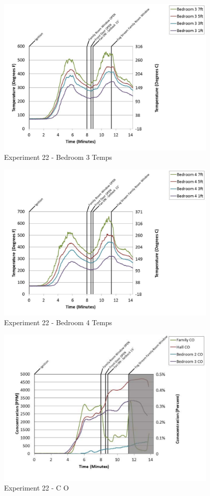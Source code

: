 \documentclass{article}
\begin{document}
\begin{appendices}
	\clearpage

	\begin{figure}[h!]
		\centering
		\includegraphics[height=3.05in]{0_Images/Results_Charts/Exp_22_Charts/Bedroom3Temps.pdf}
		\caption{Experiment 22 - Bedroom 3 Temps}
	\end{figure}
 

	\begin{figure}[h!]
		\centering
		\includegraphics[height=3.05in]{0_Images/Results_Charts/Exp_22_Charts/Bedroom4Temps.pdf}
		\caption{Experiment 22 - Bedroom 4 Temps}
	\end{figure}
 
	\clearpage

	\begin{figure}[h!]
		\centering
		\includegraphics[height=3.05in]{0_Images/Results_Charts/Exp_22_Charts/CO.pdf}
		\caption{Experiment 22 - C O}
	\end{figure}
 


\end{appendices}
\end{document}
